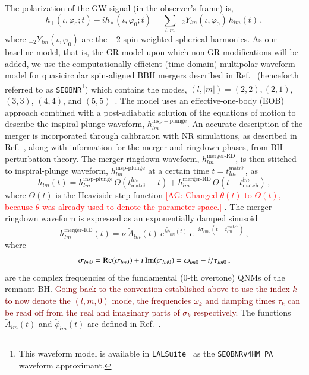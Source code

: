 \documentclass[twocolumn,
               prd,
               aps,
               superscriptaddress,
               tightenlines,
               nofootinbib,
               eqsecnum,
               amsfonts,
               amsmath,
               longbibliography]{revtex4-1}
\newcommand{\SEOB}{\texttt{SEOBNR}}
\newcommand{\agcomm}[1]{{\textcolor{red}{{[AG: #1]}} }}
\newcommand{\ag}[1]{{\textcolor{Maroon}{{#1}} }}
\begin{document}
The polarization of the GW signal (in the observer's frame) is,
%
\begin{equation}
h_+(\iota,\varphi_0;t ) - i h_\times(\iota,\varphi_0;t) = \sum_{l, m} {}_{-\!2}Y_{l m}(\iota,\varphi_0)\, h_{l m}(t)\,,
\end{equation}
%
where ${}_{-\!2}Y_{l m}(\iota,\varphi_0)$ are the $-2$ spin-weighted spherical
harmonics.
%
%
As our baseline model, that is, the GR model upon which non-GR modifications 
will be added, we use the computationally efficient (time-domain) multipolar 
waveform model for quasicircular spin-aligned BBH mergers described in 
Ref.~\cite{Mihaylov:2021bpf} (henceforth referred to as \SEOB{}\footnote{This waveform 
model is available in \texttt{LALSuite}~\cite{lalsuite} as the \texttt{SEOBNRv4HM\_PA} 
waveform approximant.}) which contains the modes, $(l, |m|)=(2,2),(2,1)$, $(3,3)$, $(4,4)$, 
and $(5,5)$~\cite{Cotesta:2018fcv,Mihaylov:2021bpf}.
%
The model uses an effective-one-body (EOB) approach combined with a
post-adiabatic solution of the equations of motion to describe the
inspiral-plunge waveform, $h_{l m}^\mathrm{insp-plunge}$.
%
An accurate description of the merger is incorporated through calibration with
NR simulations, as described in Ref.~\cite{Cotesta:2018fcv}, along with
information for the merger and ringdown phases, from BH perturbation theory.
The merger-ringdown waveform, $h_{l m}^\textrm{merger-RD}$, is then stitched to
inspiral-plunge waveform, $h_{l m}^\textrm{insp-plunge}$ at a certain time $t = t^{\textrm{match}}_{l m}$, as
%
\begin{equation}
h_{l m}(t) =
h_{l m}^\textrm{insp-plunge}\, \Theta(t_\textrm{match}^{l m} - t)
+ h_{l m}^\textrm{merger-RD}\,\Theta(t-t_\textrm{match}^{l m})\,,
\end{equation}
%
where $\Theta(t)$ is the Heaviside step function \agcomm{Changed $\theta(t)$ to $\Theta(t)$,
because $\theta$ was already used to denote the parameter space.}.
%
The merger-ringdown waveform is expressed as an exponentially damped
sinusoid~\cite{Bohe:2016gbl,Cotesta:2018fcv,Mihaylov:2021bpf}
%
\begin{equation}
\label{RD}
h_{l m}^{\textrm{merger-RD}}(t) = \nu \ \tilde{A}_{l m}(t)\ e^{i \tilde{\phi}_{l m}(t)} \ e^{-i \sigma_{l m 0}(t-t^{\textrm{match}}_{l m})}\,,
\end{equation}
%
where
%
\begin{align}
\sigma_{l m 0} = {\rm Re}(\sigma_{l m 0}) + i \, {\rm Im}(\sigma_{l m 0})
= \omega_{l m 0} - i / \tau_{l m 0}\,,
\end{align}
%
are the complex frequencies of the fundamental ($0$-th overtone) QNMs of the remnant BH.
%
\ag{Going back to the convention established above to use the index $k$ to now denote the $(l, m,0)$
mode,  the frequencies $\omega_k$ and damping times $\tau_k$ can be read off from the 
real and imaginary parts of $\sigma_k$ respectively.}
%
The functions $\tilde{A}_{l m}(t)$ and $\tilde{\phi}_{l m}(t)$ are defined
in Ref.~\cite{Bohe:2016gbl,Cotesta:2018fcv}.
\end{document}
